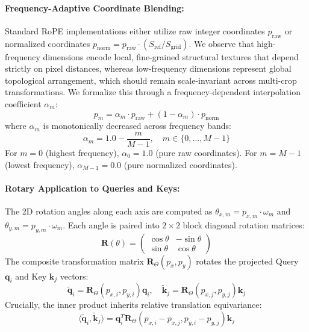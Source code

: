 \documentclass[11pt,a4paper]{article}
\begin{document}
\paragraph{Frequency-Adaptive Coordinate Blending:} Standard RoPE implementations either utilize raw integer coordinates $p_{\text{raw}}$ or normalized coordinates $p_{\text{norm}} = p_{\text{raw}} \cdot (S_{\text{ref}} / S_{\text{grid}})$. We observe that high-frequency dimensions encode local, fine-grained structural textures that depend strictly on pixel distances, whereas low-frequency dimensions represent global topological arrangement, which should remain scale-invariant across multi-crop transformations. We formalize this through a frequency-dependent interpolation coefficient $\alpha_m$:
\begin{equation}
p_m = \alpha_m \cdot p_{\text{raw}} + (1 - \alpha_m) \cdot p_{\text{norm}}
\label{eq:adaptive_coord}
\end{equation}
where $\alpha_m$ is monotonically decreased across frequency bands:
\begin{equation}
\alpha_m = 1.0 - \frac{m}{M - 1}, \quad m \in \{0, \dots, M-1\}
\label{eq:alpha_schedule}
\end{equation}
For $m=0$ (highest frequency), $\alpha_0 = 1.0$ (pure raw coordinates). For $m=M-1$ (lowest frequency), $\alpha_{M-1} = 0.0$ (pure normalized coordinates).

\paragraph{Rotary Application to Queries and Keys:} The 2D rotation angles along each axis are computed as $\theta_{x, m} = p_{x, m} \cdot \omega_m$ and $\theta_{y, m} = p_{y, m} \cdot \omega_m$. Each angle is paired into $2 \times 2$ block diagonal rotation matrices:
\begin{equation}
\mathbf{R}(\theta) = \begin{pmatrix} \cos \theta & -\sin \theta \\ \sin \theta & \cos \theta \end{pmatrix}
\label{eq:rot_matrix_2x2}
\end{equation}
The composite transformation matrix $\mathbf{R}_{\Theta}(p_x, p_y)$ rotates the projected Query $\mathbf{q}_i$ and Key $\mathbf{k}_j$ vectors:
\begin{equation}
\tilde{\mathbf{q}}_i = \mathbf{R}_{\Theta}(p_{x,i}, p_{y,i}) \mathbf{q}_i, \quad \tilde{\mathbf{k}}_j = \mathbf{R}_{\Theta}(p_{x,j}, p_{y,j}) \mathbf{k}_j
\label{eq:rotated_qk}
\end{equation}
Crucially, the inner product inherits relative translation equivariance:
\begin{equation}
\langle \tilde{\mathbf{q}}_i, \tilde{\mathbf{k}}_j \rangle = \mathbf{q}_i^T \mathbf{R}_{\Theta}(p_{x,i} - p_{x,j}, p_{y,i} - p_{y,j}) \mathbf{k}_j
\label{eq:relative_inner_product}
\end{equation}
\end{document}
